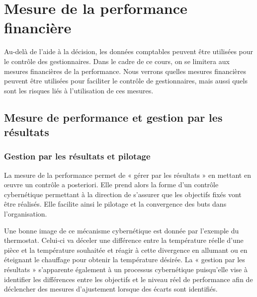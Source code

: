\documentclass[oneside]{kaobook}
\begin{document}
\chapter{Mesure de la performance financière}
\label{sec:org700260b}
Au-delà de l'aide à la décision, les données comptables peuvent être utilisées pour le contrôle des gestionnaires. Dans le cadre de ce cours, on se limitera aux mesures financières de la performance. Nous verrons quelles mesures financières peuvent être utilisées pour faciliter le contrôle de gestionnaires, mais aussi quels sont les risques liés à l'utilisation de ces mesures.
\section{Mesure de performance et gestion par les résultats}
\label{sec:org70dc80b}
\subsection{Gestion par les résultats et pilotage}
\label{sec:orgc0c8abc}
La mesure de la performance permet de « gérer par les résultats » en mettant en œuvre un contrôle a posteriori. Elle prend alors la forme d’un contrôle cybernétique permettant à la direction de s’assurer que les objectifs fixés vont être réalisés. Elle facilite ainsi le pilotage et la convergence des buts dans l’organisation.

Une bonne image de ce mécanisme cybernétique est donnée par l’exemple du thermostat. Celui-ci va déceler une différence entre la température réelle d’une pièce et la température souhaitée et réagir à cette divergence en allumant ou en éteignant le chauffage pour obtenir la température désirée. La « gestion par les résultats » s’apparente également à un processus cybernétique puisqu’elle vise à identifier les différences entre les objectifs et le niveau réel de performance afin de déclencher des mesures d’ajustement lorsque des écarts sont identifiés.
\end{document}
